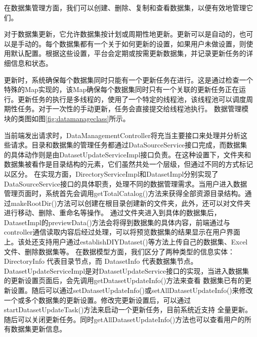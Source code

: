 在数据集管理方面，我们可以创建、删除、复制和查看数据集，以便有效地管理它们。

对于数据集更新，它允许数据集按计划或周期性地更新。更新可以是自动的，也可以是手动的。每个数据集都有一个关于如何更新的设置，如果用户未做设置，则使用默认配置。根据这些设置，平台会定期或按需更新数据集，并记录更新任务的详细信息和状态。

更新时，系统确保每个数据集同时只能有一个更新任务在进行。这是通过检查一个特殊的Map实现的，该Map确保每个数据集同时只有一个关联的更新任务正在运行。更新任务的执行是多线程的，使用了一个特定的线程池，该线程池可以调度周期性任务。对于一次性的手动更新，任务会直接提交给线程池执行。
数据管理模块的类图如图\ref{fig:datamanageclass}所示。

当前端发出请求时，DataManagementController将充当主要接口来处理并分析这些请求。目录和数据集的管理任务都通过DataSourceService接口完成，而数据集的具体动作则是由DatasetUpdateServiceImpl接口负责。在这种设置下，文件夹和数据集被看作是目录结构的元素，它们虽然共处一个层级，但通过不同的方式标记以区分。
在实现方面，DirectoryServiceImpl和DatasetImpl分别实现了DataSourceService接口的具体职责，处理不同的数据管理需求。当用户进入数据管理页面时，系统首先会调用getTotalCatalog()方法来获得全部资源目录结构。通过makeRootDir()方法可以创建在根目录创建新的文件夹，此外，还可以对文件夹进行移动、删除、重命名等操作。
通过文件夹进入到具体的数据集后，DatasetImpl的previewData()方法会将得到数据集的具体内容，前端通过与controller通信读取内容后经过处理，可以将预览数据集的结果显示在用户界面上。该处还支持用户通过establishDIYDataset()等方法上传自己的数据集、Excel文件、删除数据集等。
在数据模型方面，我们区分了两种类型的信息实体：DirectoryInfo 代表目录节点，而 DatasetInfo 代表数据集节点。DatasetUpdateServiceImpl是对DatasetUpdateService接口的实现，当进入数据集的更新设置页面后，会先调用getDatasetUpdateInfo()方法来查看
数据集已有的更新设置。随后可以通过setDatasetUpdateInfo()或setAllDatasetUpdateInfo()来修改一个或多个数据集的更新设置。修改完更新设置后，可以通过startDatasetUpdateTask()方法来启动一个更新任务，目前系统近支持
全量更新。随后可以关闭更新任务。同时getAllDatasetUpdateInfo()方法也可以查看用户的所有数据集更新信息。
